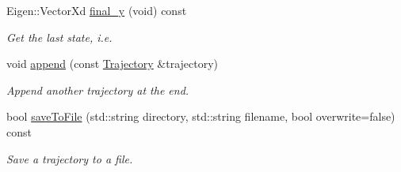 \begin{DoxyCompactItemize}
Eigen\+::\+Vector\+Xd \hyperlink{classDmpBbo_1_1Trajectory_aeb94e68102be7c8e5885e7f1ccf487e2}{final\+\_\+y} (void) const 
\begin{DoxyCompactList}\small\item\em Get the last state, i.\+e. \end{DoxyCompactList}\item 
void \hyperlink{classDmpBbo_1_1Trajectory_aac6f333ab80eb78ad2ff3cab4e8326ec}{append} (const \hyperlink{classDmpBbo_1_1Trajectory}{Trajectory} \&trajectory)
\begin{DoxyCompactList}\small\item\em Append another trajectory at the end. \end{DoxyCompactList}\item 
bool \hyperlink{classDmpBbo_1_1Trajectory_aad0f629a8d7be7400d0b5f6e990c9a1d}{save\+To\+File} (std\+::string directory, std\+::string filename, bool overwrite=false) const 
\begin{DoxyCompactList}\small\item\em Save a trajectory to a file. \end{DoxyCompactList}\end{DoxyCompactItemize}

